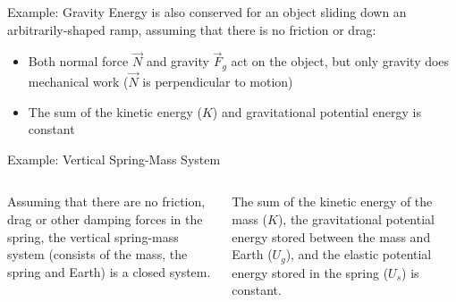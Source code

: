 \documentclass[12pt,compress,aspectratio=169]{beamer}
\begin{document}
\begin{frame}{Example: Gravity}
  Energy is also conserved for an object sliding down an arbitrarily-shaped
  ramp, assuming that there is no friction or drag:
  \begin{center}
  \end{center}
  \begin{itemize}
  \item Both normal force $\vec N$ and gravity $\vec F_g$ act on the object,
    but only gravity does mechanical work ($\vec N$ is perpendicular to motion)
  \item The sum of the kinetic energy ($K$) and gravitational potential energy
    is constant
    
  \end{itemize}
\end{frame}



\begin{frame}{Example: Vertical Spring-Mass System}
  \begin{columns}
    \centering

    Assuming that there are no friction, drag or other damping forces in the
    spring, the vertical spring-mass system (consists of the mass, the spring
    and Earth) is a closed system.

    
    The sum of the kinetic energy of the mass ($K$), the gravitational
    potential energy stored between the mass and Earth ($U_g$), and the elastic
    potential energy stored in the spring ($U_s$) is constant.
  \end{columns}
\end{frame}
\end{document}
